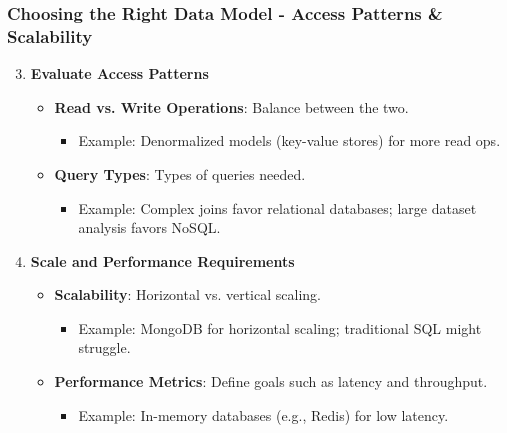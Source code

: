 \documentclass[aspectratio=169]{beamer}
\begin{document}
\begin{frame}[fragile]
    \frametitle{Choosing the Right Data Model - Access Patterns & Scalability}
    \begin{enumerate}
        \setcounter{enumi}{2}
        \item \textbf{Evaluate Access Patterns}
        \begin{itemize}
            \item \textbf{Read vs. Write Operations}: Balance between the two.
                \begin{itemize}
                    \item Example: Denormalized models (key-value stores) for more read ops.
                \end{itemize}
            \item \textbf{Query Types}: Types of queries needed.
                \begin{itemize}
                    \item Example: Complex joins favor relational databases; large dataset analysis favors NoSQL.
                \end{itemize}
        \end{itemize}

        \item \textbf{Scale and Performance Requirements}
        \begin{itemize}
            \item \textbf{Scalability}: Horizontal vs. vertical scaling.
                \begin{itemize}
                    \item Example: MongoDB for horizontal scaling; traditional SQL might struggle.
                \end{itemize}
            \item \textbf{Performance Metrics}: Define goals such as latency and throughput.
                \begin{itemize}
                    \item Example: In-memory databases (e.g., Redis) for low latency.
                \end{itemize}
        \end{itemize}
    \end{enumerate}
\end{frame}
\end{document}
